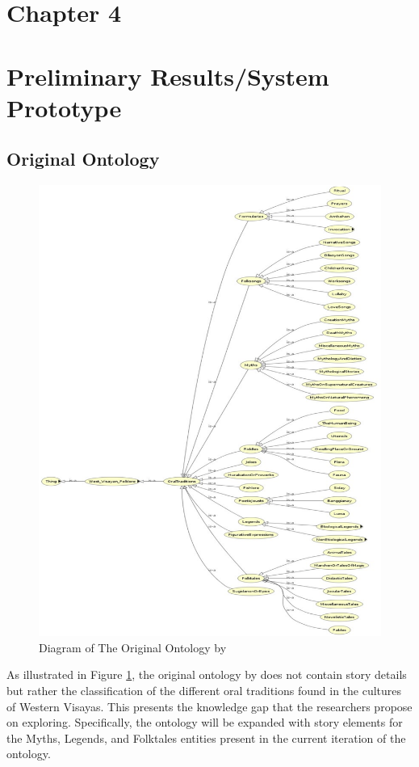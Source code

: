 \section*{Chapter 4}
\section{Preliminary Results/System Prototype}
\subsection{Original Ontology}
\begin{figure}
    \centering
    \includegraphics[width=\linewidth]{figures/Dimzon and Dimzon (2015) Ontology.png}
    \caption{Diagram of The Original Ontology by \protect{}}
    \label{fig:ontology diagram}
\end{figure}

As illustrated in Figure \ref{fig:ontology diagram}, the original ontology by  does not contain story details but rather the classification of the different oral traditions found in the cultures of Western Visayas. This presents the knowledge gap that the researchers propose on exploring. Specifically, the ontology will be expanded with story elements for the Myths, Legends, and Folktales entities present in the current iteration of the ontology.  

\FloatBarrier

